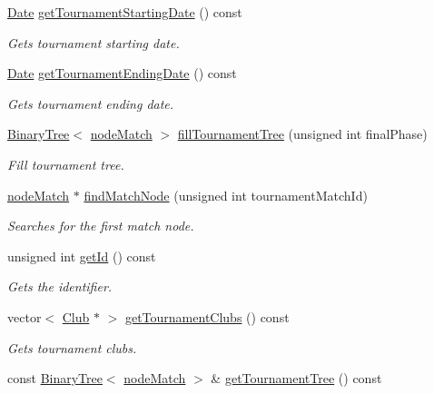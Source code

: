 \begin{DoxyCompactItemize}
\hyperlink{class_date}{Date} \hyperlink{class_tournament_a30bc0b9edbc862c7318d94199f6a94ee}{get\+Tournament\+Starting\+Date} () const
\begin{DoxyCompactList}\small\item\em Gets tournament starting date. \end{DoxyCompactList}\item 
\hyperlink{class_date}{Date} \hyperlink{class_tournament_adffedf926ee07ba1a18424f71070ad3e}{get\+Tournament\+Ending\+Date} () const
\begin{DoxyCompactList}\small\item\em Gets tournament ending date. \end{DoxyCompactList}\item 
\hyperlink{class_binary_tree}{Binary\+Tree}$<$ \hyperlink{_tournament_8hpp_a59a90f79e961bd9bc490adbf767f7cc4}{node\+Match} $>$ \hyperlink{class_tournament_ada52b0008dc78beee5c64718ce72a9ed}{fill\+Tournament\+Tree} (unsigned int final\+Phase)
\begin{DoxyCompactList}\small\item\em Fill tournament tree. \end{DoxyCompactList}\item 
\hyperlink{_tournament_8hpp_a59a90f79e961bd9bc490adbf767f7cc4}{node\+Match} $\ast$ \hyperlink{class_tournament_af89af84fd12e55685a9693551b6b7652}{find\+Match\+Node} (unsigned int tournament\+Match\+Id)
\begin{DoxyCompactList}\small\item\em Searches for the first match node. \end{DoxyCompactList}\item 
unsigned int \hyperlink{class_tournament_ad5e59e6551498b634e7bd745a7967fc9}{get\+Id} () const
\begin{DoxyCompactList}\small\item\em Gets the identifier. \end{DoxyCompactList}\item 
vector$<$ \hyperlink{class_club}{Club} $\ast$ $>$ \hyperlink{class_tournament_a51a2a85ded44857ab3798c8a9855f5b6}{get\+Tournament\+Clubs} () const
\begin{DoxyCompactList}\small\item\em Gets tournament clubs. \end{DoxyCompactList}\item 
const \hyperlink{class_binary_tree}{Binary\+Tree}$<$ \hyperlink{_tournament_8hpp_a59a90f79e961bd9bc490adbf767f7cc4}{node\+Match} $>$ \& \hyperlink{class_tournament_abeb767d12aab092bf94410e7224cf29b}{get\+Tournament\+Tree} () const

\end{DoxyCompactItemize}
